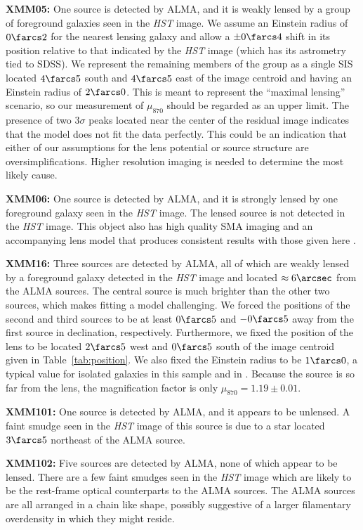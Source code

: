 \documentclass[iop]{emulateapj}
\begin{document}
{\bf XMM05:} One source is detected by ALMA, and it is weakly lensed by a group
of foreground galaxies seen in the {\it HST} image.  We assume an Einstein
radius of $0\farcs2$ for the nearest lensing galaxy and allow a $\pm0\farcs4$
shift in its position relative to that indicated by the {\it HST} image (which
has its astrometry tied to SDSS).  We represent the remaining members of the
group as a single SIS located $4\farcs5$ south and $4\farcs5$ east of the image
centroid and having an Einstein radius of $2\farcs0$.  This is meant to
represent the ``maximal lensing'' scenario, so our measurement of $\mu_{870}$
should be regarded as an upper limit.  The presence of two $3\sigma$ peaks
located near the center of the residual image indicates that the model does not
fit the data perfectly.  This could be an indication that either of our
assumptions for the lens potential or source structure are oversimplifications.
Higher resolution imaging is needed to determine the most likely cause.

{\bf XMM06:} One source is detected by ALMA, and it is strongly lensed by one
foreground galaxy seen in the {\it HST} image.  The lensed source is not
detected in the {\it HST} image.  This object also has high quality SMA imaging
and an accompanying lens model that produces consistent results with those
given here \citep{Bussmann:2013lr}.

{\bf XMM16:} Three sources are detected by ALMA, all of which are weakly lensed
by a foreground galaxy detected in the {\it HST} image and located $\approx
6\arcsec$ from the ALMA sources.  The central source is much brighter than the
other two sources, which makes fitting a model challenging.  We forced the
positions of the second and third sources to be at least $0\farcs5$ and
$-0\farcs5$ away from the first source in declination, respectively.
Furthermore, we fixed the position of the lens to be located $2\farcs5$ west
and $0\farcs5$ south of the image centroid given in Table~\ref{tab:position}.
We also fixed the Einstein radius to be $1\farcs0$, a typical value for
isolated galaxies in this sample and in \citet{Bussmann:2013lr}.  Because the
source is so far from the lens, the magnification factor is only $\mu_{870} =
1.19 \pm 0.01$.

{\bf XMM101:} One source is detected by ALMA, and it appears to be unlensed.  A
faint smudge seen in the {\it HST} image of this source is due to a star
located $3\farcs5$ northeast of the ALMA source.

{\bf XMM102:} Five sources are detected by ALMA, none of which appear to be
lensed.  There are a few faint smudges seen in the {\it HST} image which are
likely to be the rest-frame optical counterparts to the ALMA sources.  The ALMA
sources are all arranged in a chain like shape, possibly suggestive of a larger
filamentary overdensity in which they might reside.
\end{document}
